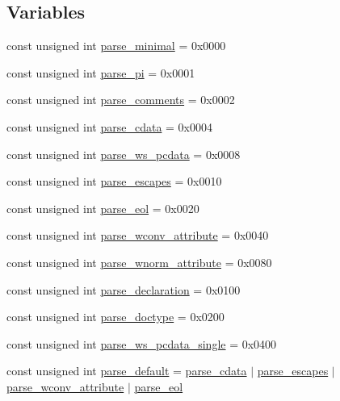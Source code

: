 \subsection*{Variables}
\begin{DoxyCompactItemize}
\item 
const unsigned int \hyperlink{namespacepugi_ae5058761cfd25d6cdb7e092659dae1fd}{parse\-\_\-minimal} = 0x0000
\item 
const unsigned int \hyperlink{namespacepugi_a8fb7ea408d60b4f2ca79dd30b651f545}{parse\-\_\-pi} = 0x0001
\item 
const unsigned int \hyperlink{namespacepugi_adcab316176bfaf69158339962fb4ad38}{parse\-\_\-comments} = 0x0002
\item 
const unsigned int \hyperlink{namespacepugi_a47b679897f8bc15e4e152978fc88c208}{parse\-\_\-cdata} = 0x0004
\item 
const unsigned int \hyperlink{namespacepugi_ae492a24302294f1ce3fbd56f2edbf131}{parse\-\_\-ws\-\_\-pcdata} = 0x0008
\item 
const unsigned int \hyperlink{namespacepugi_ab5ef8454110599611900ff48012c8ad6}{parse\-\_\-escapes} = 0x0010
\item 
const unsigned int \hyperlink{namespacepugi_ad4e017365d2ff3ee04e226c35129b475}{parse\-\_\-eol} = 0x0020
\item 
const unsigned int \hyperlink{namespacepugi_a1e943812f2de36fc3ee14f7756afdbd7}{parse\-\_\-wconv\-\_\-attribute} = 0x0040
\item 
const unsigned int \hyperlink{namespacepugi_a8617ea5ba78c676aff8b7af960cb2f4b}{parse\-\_\-wnorm\-\_\-attribute} = 0x0080
\item 
const unsigned int \hyperlink{namespacepugi_adb5db03ce720dcd90e900b9bb7e70427}{parse\-\_\-declaration} = 0x0100
\item 
const unsigned int \hyperlink{namespacepugi_afa993ffcd3e228d21f48071e7c097f32}{parse\-\_\-doctype} = 0x0200
\item 
const unsigned int \hyperlink{namespacepugi_ae7c892ad8288b363daca0c3e1a8e38ee}{parse\-\_\-ws\-\_\-pcdata\-\_\-single} = 0x0400
\item 
const unsigned int \hyperlink{namespacepugi_ad7c927d1c1752330637c3318b0d7b366}{parse\-\_\-default} = \hyperlink{namespacepugi_a47b679897f8bc15e4e152978fc88c208}{parse\-\_\-cdata} $|$ \hyperlink{namespacepugi_ab5ef8454110599611900ff48012c8ad6}{parse\-\_\-escapes} $|$ \hyperlink{namespacepugi_a1e943812f2de36fc3ee14f7756afdbd7}{parse\-\_\-wconv\-\_\-attribute} $|$ \hyperlink{namespacepugi_ad4e017365d2ff3ee04e226c35129b475}{parse\-\_\-eol}

\end{DoxyCompactItemize}

